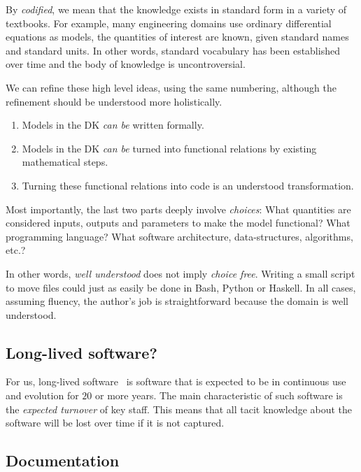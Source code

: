 \documentclass[a4paper,UKenglish,cleveref,autoref,thm-restate]{oasics-v2021}
\begin{document}
By \emph{codified}, we mean that the knowledge exists in standard form in a
variety of textbooks. For example, many engineering domains use ordinary
differential equations as models, the quantities of interest are known, given
standard names and standard units. In other words, standard vocabulary has been
established over time and the body of knowledge is uncontroversial.

We can refine these high level ideas, using the same numbering, although the
refinement should be understood more holistically.
\begin{enumerate}
\item Models in the DK \emph{can be} written formally.
\item Models in the DK \emph{can be} turned into functional relations by
 existing mathematical steps.
\item Turning these functional relations into code is an understood
 transformation.
\end{enumerate}
Most importantly, the last two parts deeply involve \emph{choices}: What
quantities are considered inputs, outputs and parameters to make the model
functional? What programming language?  What software architecture,
data-structures, algorithms, etc.?

In other words, \emph{well understood} does not imply \emph{choice free}.
Writing a small script to move files could just as easily be done in Bash,
Python or Haskell. In all cases, assuming fluency, the author's job is
straightforward because the domain is well understood.

\subsection{Long-lived software?}
\label{subsec:long-lived-software}

For us, long-lived software~\cite{SPL-long-lived} is software that is expected
to be in continuous use and evolution for \(20\) or more years. The main
characteristic of such software is the \emph{expected turnover} of key staff.
This means that all tacit knowledge about the software will be lost over time if
it is not captured.

\subsection{Documentation}
\label{subsec:documentation}
\end{document}
